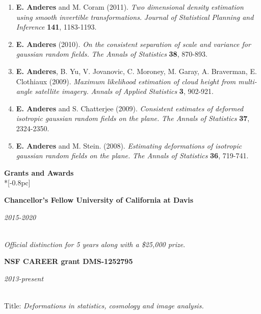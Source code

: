 \documentclass[11pt]{article}
\newcommand{\head}[1]{
  \vspace{10pt}
  {\Large \bf #1} \\*[-0.8pc]
  \underline{\hspace{6.07in}}}
\newcommand{\datedentry}[2]{
  \vspace{5pt}
  \begin{minipage}{5in}{\textbf{#1}}\end{minipage}
  \hfill
  \begin{minipage}{1in}{\hfill\textit{#2}}\end{minipage}
  }
\begin{document}
\begin{enumerate}[labelindent=0pt]
\item
{\bf E. Anderes} and M. Coram (2011).   \textsl{Two dimensional density estimation using smooth invertible transformations.}
 \textit{Journal of Statistical Planning and Inference} {\bf 141}, 1183-1193.



\item
{\bf E. Anderes} (2010).  \textsl{On the consistent separation of scale and variance for gaussian random fields.} \textit{The Annals of Statistics} {\bf 38}, 870-893.



\item
{\bf E. Anderes}, B. Yu, V. Jovanovic, C. Moroney, M. Garay, A. Braverman, E. Clothiaux (2009).
\textsl{Maximum likelihood estimation of cloud height from multi-angle satellite imagery.}   \textit{Annals of Applied Statistics} {\bf 3}, 902-921.


\item
{\bf E. Anderes} and S. Chatterjee (2009). \textsl{Consistent estimates of deformed isotropic gaussian random fields on the plane.} \textit{The Annals of Statistics} {\bf 37}, 2324-2350.



\item
{\bf E. Anderes} and M. Stein. (2008). \textsl{Estimating deformations of isotropic gaussian random fields on the plane.} \textit{The Annals of Statistics} {\bf 36}, 719-741.


 \end{enumerate}

\newpage

%
%

\head{Grants and Awards}%
 \vspace{.1mm}


\datedentry{Chancellor's Fellow University of California at Davis}{2015-2020}\\
{\sl Official distinction for 5 years along with a \$25,000 prize}.

\vspace{7pt}

\datedentry{NSF CAREER grant DMS-1252795}{2013-present}\\
Title: {\sl Deformations in statistics, cosmology and image analysis.}

\vspace{7pt}
\end{document}
